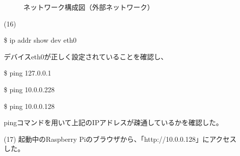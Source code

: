 \documentclass[12pt,a4paper]{jsarticle}
\numberwithin{equation}{section}
\numberwithin{figure}{section}
\numberwithin{table}{section}
\begin{document}
\begin{itemize}
\begin{figure}[H]
\begin{center}
\begin{circuitikz}
        \end{circuitikz}
      \end{center}
      \caption{ネットワーク構成図（外部ネットワーク）}\label{fig:ネットワーク構成図３}
    \end{figure}
      \begin{table}[H]
        \caption{各種サーバのIPアドレス(2週目のL2スイッチ接続時)}\label{tab:IP_tab3}
        \begin{center}
        \end{center}
        \end{table}
      \newpage
      \item [(16)]\quad
      \begin{screen}
        \$ ip addr show dev eth0
      \end{screen}
      デバイスeth0が正しく設定されていることを確認し、
      \begin{screen}
        \$ ping 127.0.0.1
      \end{screen}
      \begin{screen}
        \$ ping 10.0.0.228
      \end{screen}
      \begin{screen}
        \$ ping 10.0.0.128
      \end{screen}
      pingコマンドを用いて上記のIPアドレスが疎通しているかを確認した。
      \item [(17)]起動中のRaspberry Piのブラウザから、「http://10.0.0.128」にアクセスした。

\end{itemize}
\end{document}
